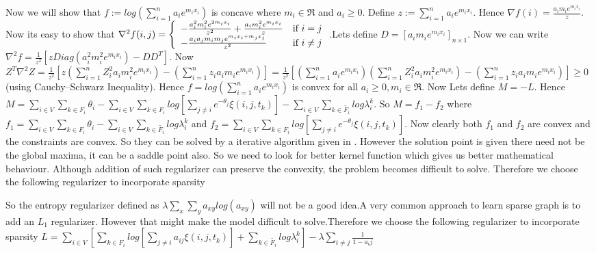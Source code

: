 Now we will show that $f := log(\displaystyle\sum_{i=1}^{n}a_ie^{m_ix_i})$ is concave where $m_i \in \Re$ and $a_i \geq 0$. Define $z := \displaystyle\sum_{i=1}^{n}a_ie^{m_ix_i}$. Hence $\nabla f (i) = \frac{a_im_ie^{m_ix_i}}{z}$. Now its easy to show that $\nabla^2 f(i,j) = \left\{ \begin{array}{ll} -\frac{a_{i}^{2}m_{i}^2e^{2m_ix_i}}{z^2} + \frac{a_im_i^2e^{m_ix_i}}{z} & \mbox{if } i = j \\ -\frac{a_ia_jm_im_je^{m_ix_i+m_jx_j}}{z^2} & \mbox{if } i \neq j \end{array} \right.$.Lets define $D = [a_im_ie^{m_ix_i}]_{n \times 1}$. Now we can write $\nabla^2 f = \frac{1}{z^2}[zDiag(a_i^2m_i^2e^{m_ix_i})-DD^T]$. Now $Z^T \nabla^2 Z = \frac{1}{z^2}[z(\displaystyle\sum_{i=1}^{n} Z_i^2a_im_i^2e^{m_ix_i})-(\displaystyle\sum_{i=1}^{n}z_ia_im_ie^{m_ix_i})] = \frac{1}{z^2}[(\displaystyle\sum_{i=1}^{n}a_ie^{m_ix_i})(\displaystyle\sum_{i=1}^{n} Z_i^2a_im_i^2e^{m_ix_i}) - (\displaystyle\sum_{i=1}^{n}z _ia_im_ie^{m_ix_i})] \geq 0$ (using Cauchy–Schwarz Inequality). Hence $f = log(\displaystyle\sum_{i=1}^{n}a_ie^{m_ix_i})$ is convex for all $a_i \geq 0,m_i \in \Re$. Now Lets define $M = -L$. Hence $M = \displaystyle\sum_{i \in V}\displaystyle\sum_{k \in F_i}\theta_i-\displaystyle\sum_{i \in V}\displaystyle\sum_{k \in F_i}log[\displaystyle\sum_{j \neq i} e^{-\theta_j}\xi (i,j,t_k)]-\displaystyle\sum_{i \in V}\displaystyle\sum_{k \in \widetilde{F_{i}}}log\lambda_{i}^{k}$. So $M = f_1 - f_2$ where $f_1 = \displaystyle\sum_{i \in V}\displaystyle\sum_{k \in F_i}\theta_i-\displaystyle\sum_{i \in V}\displaystyle\sum_{k \in \widetilde{F_{i}}}log\lambda_{i}^{k}$ and $f_2 = \displaystyle\sum_{i \in V}\displaystyle\sum_{k \in F_i}log[\displaystyle\sum_{j \neq i} e^{-\theta_j}\xi (i,j,t_k)]$. Now clearly both $f_1$ and $f_2$ are convex and the constraints are convex. So they can be solved by a iterative algorithm given in \cite{cccp}. However the solution point is given there need not be the global maxima, it can be a saddle point also. So we need to look for better kernel function which gives us better mathematical behaviour.
Although addition of such regularizer can preserve the convexity, the problem becomes difficult to solve. Therefore we choose the following regularizer to incorporate sparsity

 So the entropy regularizer defined as $\lambda \displaystyle\sum_x \displaystyle\sum_y a_{xy}log(a_{xy})$ will not be a good idea.A very common approach to learn sparse graph is to add an $L_1$ regularizer. However that might make the model difficult to solve.Therefore we choose the following regularizer to incorporate sparsity
$L = \displaystyle\sum_{i \in V}[\displaystyle\sum_{k \in F_i}log[\displaystyle\sum_{j \neq i} a_{ij}\xi (i,j,t_k)]+\displaystyle\sum_{k \in \widetilde{F_{i}}}log\lambda_{i}^{k}] - \lambda \displaystyle\sum_{i \neq j} \frac{1}{1 - a_ij}$